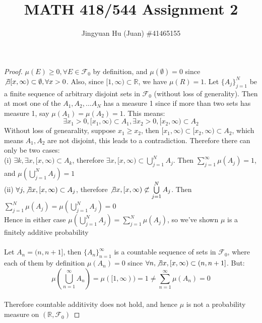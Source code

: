 \documentclass[10pt]{article}
\newenvironment{problem}[2][Problem]{\begin{trivlist}
\item[\hskip \labelsep {\bfseries #1}\hskip \labelsep {\bfseries #2.}]}{\end{trivlist}}
\begin{document}
 
\title{\vspace{-1.6cm} \large{MATH 418/544 Assignment 2}}
\author{\large{ Jingyuan Hu (Juan) \#41465155}}
\date{}
\maketitle
 
\begin{problem}{1}
\end{problem}
\begin{proof}
$\mu(E) \ge 0, \forall E \in \mathcal{F}_{0}$ by definition, and $\mu(\emptyset) = 0$ since $\not\exists [x, \infty) \subset \emptyset, \forall x >0$. Also, since $[1,\infty) \subset \mathbb{R}$, we have $\mu(R) = 1$.
Let $\{A_{j}\}_{j=1}^{N}$ be a finite sequence of arbitrary disjoint sets in $\mathcal{F}_{0}$ (without loss of generality). Then at most one of the $A_{1}, A_{2}, ... A_{N}$ has a measure 1 since if more than two sets has measure 1, say $\mu(A_{1}) = \mu(A_{2}) = 1$. This means:\\
$$\exists x_{1} > 0, [x_{1}, \infty) \subset A_{1}, \exists x_{2} > 0, [x_{2}, \infty) \subset A_{2}$$
Without loss of genearality, suppose $x_{1} \ge x_{2}$, then $[x_{1},\infty) \subset [x_{2},\infty) \subset A_{2}$, which means $A_{1}, A_{2}$ are not disjoint, this leads to a contradiction.
Therefore there can only be two cases:\\
(i) $\exists k, \exists x, [x, \infty) \subset A_{k}$, therefore $\exists x,[x, \infty) \subset \bigcup\limits_{j=1}^{N}A_{j}$.
Then $\sum\limits_{j=1}^{\infty} \mu(A_{j}) = 1$, and $\mu(\bigcup\limits_{j=1}^{N}A_{j}) = 1$\\
(ii) $\forall j, \not\exists x, [x, \infty) \subset A_{j}$, therefore $\not\exists x,[x, \infty) \not\subset \bigcup\limits_{j=1}^{N}A_{j}$.
Then $\sum\limits_{j=1}^{N} \mu(A_{j}) = \mu(\bigcup\limits_{j=1}^{N}A_{j}) = 0$
\\
Hence in either case $\mu(\bigcup\limits_{j=1}^{N}A_{j}) = \sum\limits_{j=1}^{N} \mu(A_{j})$, so we've shown $\mu$ is a finitely additive probability\\
\\
Let $A_{n} = (n, n+1]$, then $\{A_{n}\}_{n=1}^{\infty}$ is a countable sequence of sets in $\mathcal{F}_{0}$, where each of them by definition $\mu(A_{n})=0$ since $\forall n, \not\exists x, [x,\infty) \subset (n, n+1]$.
But: $$\mu(\bigcup\limits_{n=1}^{\infty}A_{n}) = \mu([1,\infty)) = 1 \neq \sum\limits_{n=1}^{\infty} \mu(A_{n}) = 0$$\\
Therefore countable additivity does not hold, and hence $\mu$ is not a probability measure on $(\mathbb{R}, \mathcal{F}_{0})$
\end{proof}
\end{document}
